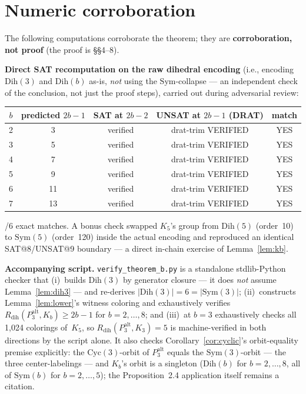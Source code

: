 \documentclass[11pt]{article}
\theoremstyle{definition}
\newcommand{\Dih}{\mathrm{Dih}}
\newcommand{\Sym}{\mathrm{Sym}}
\newcommand{\Cyc}{\mathrm{Cyc}}
\newcommand{\Rdih}{R_{\mathrm{dih}}}
\newcommand{\Palt}{P_3^{\mathrm{alt}}}
\begin{document}
\section{Numeric corroboration}

The following computations corroborate the theorem; they are
\textbf{corroboration, not proof} (the proof is \S\S4--8).

\medskip\noindent\textbf{Direct SAT recomputation on the raw dihedral encoding}
(i.e., encoding $\Dih(3)$ and $\Dih(b)$ as-is, \emph{not} using the
$\Sym$-collapse --- an independent check of the conclusion, not just the proof
steps), carried out during adversarial review:

\medskip
\begin{center}
\begin{tabular}{@{}ccccc@{}}
\toprule
$b$ & predicted $2b{-}1$ & SAT at $2b{-}2$ & UNSAT at $2b{-}1$ (DRAT) & match \\
\midrule
2 &  3 & verified & drat-trim VERIFIED & YES \\
3 &  5 & verified & drat-trim VERIFIED & YES \\
4 &  7 & verified & drat-trim VERIFIED & YES \\
5 &  9 & verified & drat-trim VERIFIED & YES \\
6 & 11 & verified & drat-trim VERIFIED & YES \\
7 & 13 & verified & drat-trim VERIFIED & YES \\
\bottomrule
\end{tabular}
\end{center}

/6 exact matches. A bonus check swapped $K_5$'s group from $\Dih(5)$ (order~10)
to $\Sym(5)$ (order~120) inside the actual encoding and reproduced an identical
SAT@8/UNSAT@9 boundary --- a direct in-chain exercise of Lemma~\ref{lem:kb}.

\medskip\noindent\textbf{Accompanying script.}\quad
\texttt{verify\_theorem\_b.py} is a standalone stdlib-Python checker that
(i)~builds $\Dih(3)$ by generator closure --- it does \emph{not} assume
Lemma~\ref{lem:dih3} --- and re-derives $|\Dih(3)| = 6 = |\Sym(3)|$;
(ii)~constructs Lemma~\ref{lem:lower}'s witness coloring and exhaustively verifies
$\Rdih(\Palt, K_b) \ge 2b-1$ for $b = 2,\ldots,8$; and
(iii)~at $b=3$ exhaustively checks all 1,024 colorings of~$K_5$, so
$\Rdih(\Palt, K_3) = 5$ is machine-verified in both directions by the script
alone. It also checks Corollary~\ref{cor:cyclic}'s orbit-equality premise
explicitly: the $\Cyc(3)$-orbit of $\Palt$ equals the $\Sym(3)$-orbit --- the
three center-labelings --- and $K_b$'s orbit is a singleton ($\Dih(b)$ for
$b = 2,\ldots,8$, all of $\Sym(b)$ for $b = 2,\ldots,5$); the
Proposition~2.4 application itself remains a citation.
\end{document}
